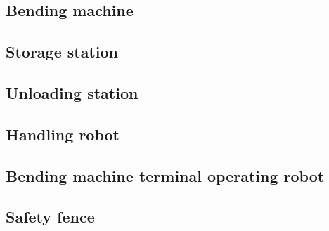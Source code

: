 


\subsection{Bending machine}
\label{sub:bending-machine}

\subsection{Storage station}
\label{sub:storage-station}

\subsection{Unloading station}
\label{sub:unloading-station}

\subsection{Handling robot}
\label{sub:handling-robot}

\subsection{Bending machine terminal operating robot}
\label{sub:panda-robot}

\subsection{Safety fence}
\label{sub:safety-fence}





